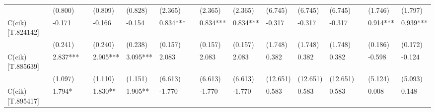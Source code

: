 \begin{table}
\begin{center}
\begin{tabular}{lllllllllllllll}
                  & (0.800)            &                    & (0.809)                & (0.828)             & (2.365)              &                      & (2.365)                  & (2.365)               & (6.745)              & (6.745)                  & (6.745)               &                               & (1.746)                                   & (1.797)                                 \\
C(cik)[T.824142]  & -0.171             &                    & -0.166                 & -0.154              & 0.834***             &                      & 0.834***                 & 0.834***              & -0.317               & -0.317                   & -0.317                &                               & 0.914***                                  & 0.939***                                \\
                  & (0.241)            &                    & (0.240)                & (0.238)             & (0.157)              &                      & (0.157)                  & (0.157)               & (1.748)              & (1.748)                  & (1.748)               &                               & (0.186)                                   & (0.172)                                 \\
C(cik)[T.885639]  & 2.837***           &                    & 2.905***               & 3.095***            & 2.083                &                      & 2.083                    & 2.083                 & 0.382                & 0.382                    & 0.382                 &                               & -0.598                                    & -0.124                                  \\
                  & (1.097)            &                    & (1.110)                & (1.151)             & (6.613)              &                      & (6.613)                  & (6.613)               & (12.651)             & (12.651)                 & (12.651)              &                               & (5.124)                                   & (5.093)                                 \\
C(cik)[T.895417]  & 1.794*             &                    & 1.830**                & 1.905**             & -1.770               &                      & -1.770                   & -1.770                & 0.583                & 0.583                    & 0.583                 &                               & 0.008                                     & 0.148                                   \\

\end{tabular}
\end{center}
\end{table}
